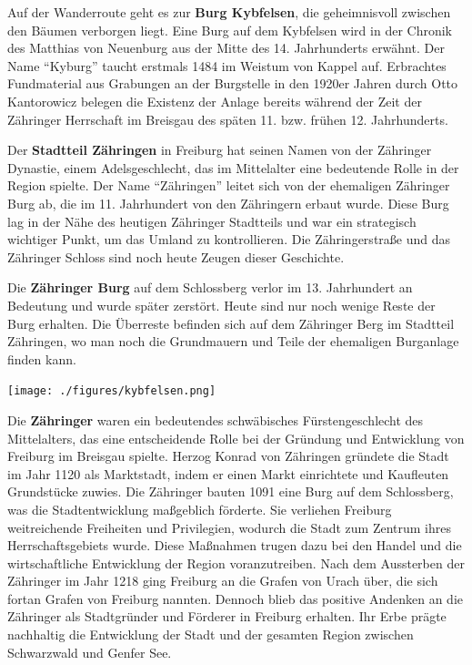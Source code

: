 \documentclass[landscape, a4paper]{article}
\newcommand\alert[1]{\textcolor{PrimaryColor}{\textbf{#1}}}
\begin{document}
\begin{minipage}[t]{0.31\textwidth}
	\setlength{\parskip}{0.25cm}
	\vspace{0cm}

	Auf der Wanderroute geht es zur \alert{Burg Kybfelsen}, die geheimnisvoll zwischen den Bäumen verborgen liegt. Eine Burg auf dem Kybfelsen wird in der Chronik des Matthias von Neuenburg aus der Mitte des 14. Jahrhunderts erwähnt. Der Name \enquote{Kyburg} taucht erstmals 1484 im Weistum von Kappel auf. Erbrachtes Fundmaterial aus Grabungen an der Burgstelle in den 1920er Jahren durch Otto Kantorowicz belegen die Existenz der Anlage bereits während der Zeit der Zähringer Herrschaft im Breisgau des späten 11. bzw. frühen 12. Jahrhunderts. %

	Der \alert{Stadtteil Zähringen} in Freiburg hat seinen Namen von der Zähringer Dynastie, einem Adelsgeschlecht, das im Mittelalter eine bedeutende Rolle in der Region spielte. Der Name \enquote{Zähringen} leitet sich von der ehemaligen Zähringer Burg ab, die im 11. Jahrhundert von den Zähringern erbaut wurde. Diese Burg lag in der Nähe des heutigen Zähringer Stadtteils und war ein strategisch wichtiger Punkt, um das Umland zu kontrollieren. Die Zähringerstraße und das Zähringer Schloss sind noch heute Zeugen dieser Geschichte.

	Die \alert{Zähringer Burg} auf dem Schlossberg verlor im 13. Jahrhundert an Bedeutung und wurde später zerstört. Heute sind nur noch wenige Reste der Burg erhalten. Die Überreste befinden sich auf dem Zähringer Berg im Stadtteil Zähringen, wo man noch die Grundmauern und Teile der ehemaligen Burganlage finden kann.

	\texttt{[image: ./figures/kybfelsen.png]}
	\setlength{\parskip}{0.25cm}

	Die \alert{Zähringer} waren ein bedeutendes schwäbisches Fürstengeschlecht des Mittelalters, das eine entscheidende Rolle bei der Gründung und Entwicklung von Freiburg im Breisgau spielte. Herzog Konrad von Zähringen gründete die Stadt im Jahr 1120 als Marktstadt, indem er einen Markt einrichtete und Kaufleuten Grundstücke zuwies. Die Zähringer bauten 1091 eine Burg auf dem Schlossberg, was die Stadtentwicklung maßgeblich förderte. Sie verliehen Freiburg weitreichende Freiheiten und Privilegien, wodurch die Stadt zum Zentrum ihres Herrschaftsgebiets wurde. Diese Maßnahmen trugen dazu bei den Handel und die wirtschaftliche Entwicklung der Region voranzutreiben. Nach dem Aussterben der Zähringer im Jahr 1218 ging Freiburg an die Grafen von Urach über, die sich fortan Grafen von Freiburg nannten. Dennoch blieb das positive Andenken an die Zähringer als Stadtgründer und Förderer in Freiburg erhalten. Ihr Erbe prägte nachhaltig die Entwicklung der Stadt und der gesamten Region zwischen Schwarzwald und Genfer See.


\end{minipage}
\end{document}

